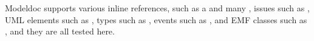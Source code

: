 Modeldoc supports various inline references, such as a  and many ,
issues such as ,
UML elements such as ,
types such as ,
events such as ,
and EMF classes such as ,
and they are all tested here.